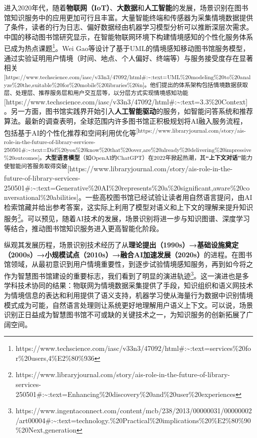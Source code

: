 \documentclass[
  letterpaper,
]{scrbook}
\begin{document}
进入2020年代，随着\textbf{物联网（IoT）}、\textbf{大数据}和\textbf{人工智能}的发展，场景识别在图书馆知识服务中的应用更加可行且丰富。大量智能终端和传感器为采集情境数据提供了条件，读者的行为日志、偏好数据经由机器学习模型分析可以推断深层次需求。中国的移动图书馆研究显示，在智能物联网环境下构建情境感知的个性化服务体系已成为热点课题\footnote{https://www.techscience.com/iasc/v33n3/47092/html\#:\textasciitilde:text=services\%20for\%20users,4\%E2\%80\%936}。Wei
Gao等设计了基于UML的情境感知移动图书馆服务模型，通过实验证明用户情境（时间、地点、个人偏好、终端等）与服务接受度存在显著相关\textsuperscript{{[}https://www.techscience.com/iasc/v33n3/47092/html\#:\textasciitilde:text=UML\%20modeling\%20to\%20analyze\%20the,suitable\%20for\%20mobile\%20libraries\%20in{]}。他们提出的体系架构包括情境数据获取层、处理层、推荐服务层和用户交互层等，以分层方式实现情境感知功能}{[}https://www.techscience.com/iasc/v33n3/47092/html\#:\textasciitilde:text=3.3\%20Context{]}。另一方面，图书馆实践界开始引入\textbf{人工智能驱动}的服务，如智能问答系统和推荐算法。最新的调查表明，全球范围内许多图书馆正积极规划将AI融入服务流程，包括基于AI的个性化推荐和空间利用优化等\textsuperscript{{[}https://www.libraryjournal.com/story/ais-role-in-the-future-of-library-services-250501\#:\textasciitilde:text=Did\%20you\%20know\%20that\%20over,are\%20already\%20delivering\%20impressive\%20outcomes{]}。\textbf{大型语言模型}（如OpenAI的ChatGPT）在2022年掀起热潮，其\textbf{``上下文对话''}能力使智能问答服务取得突破}{[}https://www.libraryjournal.com/story/ais-role-in-the-future-of-library-services-250501\#:\textasciitilde:text=Generative\%20AI\%20represents\%20a\%20significant,aware\%20conversational\%20abilities{]}。一些高校图书馆已经试验让读者用自然语言提问，由AI检索馆藏并给出参考答案，这实际上利用了模型对语义和上下文的理解来提升知识服务\footnote{https://www.libraryjournal.com/story/ais-role-in-the-future-of-library-services-250501\#:\textasciitilde:text=Enhancing\%20discovery\%20and\%20user\%20experiences}。可以预见，随着AI技术的发展，场景识别将进一步与知识图谱、深度学习等结合，推动图书馆知识服务进入更高智能化阶段。

纵观其发展历程，场景识别技术经历了从\textbf{理论提出（1990s）→基础设施奠定（2000s）→小规模试点（2010s）→融合AI加速发展（2020s）}的进程。在图书馆领域，从最初意识到用户情境重要性，到逐步试验情境感知服务，再到如今将之作为智慧图书馆建设的重要标志，我们看到了明显的演进轨迹\footnote{https://www.ingentaconnect.com/content/mcb/238/2013/00000031/00000002/art00004\#:\textasciitilde:text=technology.\%20Practical\%20implications\%20\%E2\%80\%90\%20Next,generation}。这一演进也是多学科技术协同的结果：物联网为情境数据采集提供了手段，知识组织和语义网技术为情境信息的表达和利用提供了语义支持，机器学习使从海量行为数据中识别情境模式成为可能，自然语言处理则让系统更好地理解用户语义上下文。可以说，场景识别正日益成为智慧图书馆不可或缺的关键技术之一，为知识服务的创新拓展了广阔空间。
\end{document}
